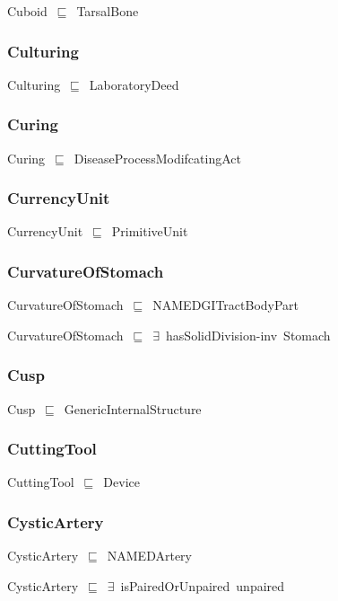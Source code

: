 \documentclass{article}
\begin{document}
Cuboid~\ensuremath{\sqsubseteq}~TarsalBone~

\subsubsection*{Culturing}

Culturing~\ensuremath{\sqsubseteq}~LaboratoryDeed~

\subsubsection*{Curing}

Curing~\ensuremath{\sqsubseteq}~DiseaseProcessModifcatingAct~

\subsubsection*{CurrencyUnit}

CurrencyUnit~\ensuremath{\sqsubseteq}~PrimitiveUnit~

\subsubsection*{CurvatureOfStomach}

CurvatureOfStomach~\ensuremath{\sqsubseteq}~NAMEDGITractBodyPart~

CurvatureOfStomach~\ensuremath{\sqsubseteq}~\ensuremath{\exists}~hasSolidDivision-inv~Stomach~

\subsubsection*{Cusp}

Cusp~\ensuremath{\sqsubseteq}~GenericInternalStructure~

\subsubsection*{CuttingTool}

CuttingTool~\ensuremath{\sqsubseteq}~Device~

\subsubsection*{CysticArtery}

CysticArtery~\ensuremath{\sqsubseteq}~NAMEDArtery~

CysticArtery~\ensuremath{\sqsubseteq}~\ensuremath{\exists}~isPairedOrUnpaired~unpaired~
\end{document}
